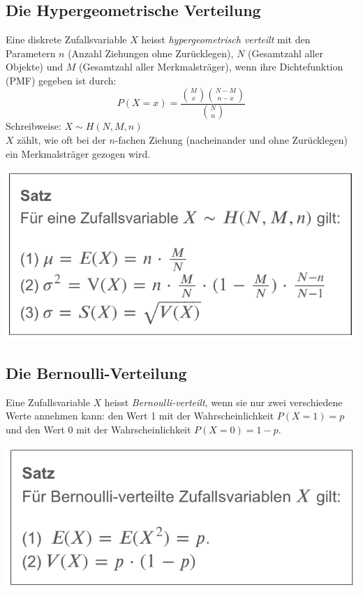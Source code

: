 \subsection{Die Hypergeometrische Verteilung}
\label{subsec:hypergeometrische_verteilung}
Eine diskrete Zufallsvariable $X$ heisst \textit{hypergeometrisch verteilt} mit den Parametern $n$ (Anzahl Ziehungen ohne Zurücklegen),
$N$ (Gesamtzahl aller Objekte) und $M$ (Gesamtzahl aller Merkmalsträger), wenn ihre Dichtefunktion (PMF) gegeben ist durch:
\begin{equation*}
    P(X = x) = \frac{\binom{M}{x}\binom{N-M}{n-x}}{\binom{N}{n}}
\end{equation*}
Schreibweise: $X \sim H(N, M, n)$ \\
$X$ zählt, wie oft bei der $n$-fachen Ziehung (nacheinander und ohne Zurücklegen) ein Merkmalsträger gezogen wird.
\begin{center}
    \includegraphics[width=0.5\linewidth]{images/satz2.png}
\end{center}
\subsection{Die Bernoulli-Verteilung}
\label{subsec:bernoulli_verteilung}
Eine Zufallsvariable $X$ heisst \textit{Bernoulli-verteilt}, wenn sie nur zwei verschiedene Werte annehmen kann: den Wert 1 mit der Wahrscheinlichkeit
$P(X = 1) = p$ und den Wert 0 mit der Wahrscheinlichkeit $P(X = 0) = 1 - p$. \\
\begin{center}
    \includegraphics[width=0.5\linewidth]{images/satz3.png}
\end{center}
